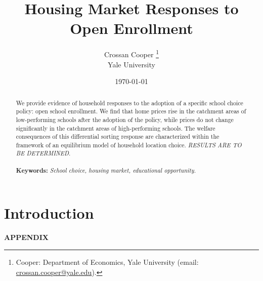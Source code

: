 \documentclass[12pt]{article}
\title{Housing Market Responses to Open Enrollment}
\author{
\begin{tabular}{ccc}
 Crossan Cooper \thanks{\scriptsize 
Cooper: Department of Economics, Yale University (email: \href{mailto:crossan.cooper@yale.edu}{crossan.cooper@yale.edu}).} \\
Yale University
\end{tabular}
}
\date{\normalsize
\today}
\begin{document}
\maketitle

\begin{abstract}
\singlespacing
\noindent We provide evidence of household responses to the adoption of a specific school choice policy: open school enrollment.
We find that home prices rise in the catchment areas of
low-performing schools after the adoption of the policy, while prices do not change significantly in the catchment areas of high-performing schools. The welfare consequences of this differential sorting response are characterized within the framework of an equilibrium model of household location choice. \textit{RESULTS ARE TO BE DETERMINED}. \\ 

\text{} \\

\noindent \textbf{Keywords:} \textit{School choice, housing market, educational opportunity.} 

\end{abstract}
\vfill

\newpage
\tableofcontents

\doublespacing

\newpage
\section{Introduction}




\clearpage
\begin{singlespace}


\end{singlespace}

\clearpage
\let\origappendix\appendix %
\renewcommand\appendix{\clearpage{}\origappendix}

\appendix
{}
\newpage

\FloatBarrier


\begin{center}
    {\Large \textbf{APPENDIX \medskip \\}}
\end{center}
\end{document}
